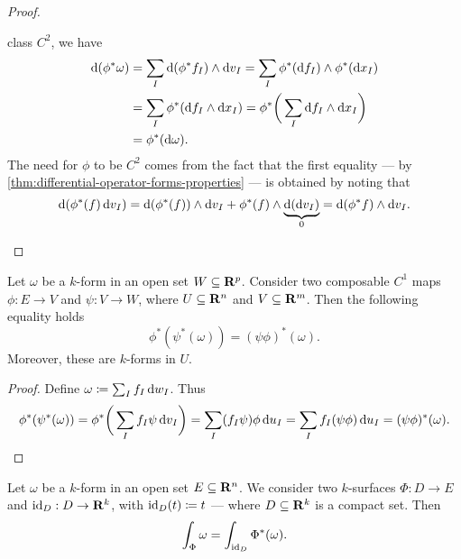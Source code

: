 \begin{proof}
\begin{enumerate}[(a)]
              class \(C^2\), we have
              \begin{align*}
                  \mathrm{d} (\phi^{*} \omega)
                   & = \sum_I \mathrm{d}(\phi^{*} f_{I}) \wedge \mathrm{d} v_{I}
                  = \sum_I \phi^{*}(\mathrm{d} f_I) \wedge \phi^{*} (\mathrm{d} x_{I}) \\
                   & = \sum_I \phi^{*}(\mathrm{d} f_I \wedge \mathrm{d} x_I)
                  = \phi^{*} \bigg( \sum_I \mathrm{d} f_I \wedge \mathrm{d} x_I \bigg) \\
                   & = \phi^{*}(\mathrm{d} \omega).
              \end{align*}
              The need for \(\phi\) to be \(C^2\) comes from the fact that the first
              equality --- by \cref{thm:differential-operator-forms-properties} --- is
              obtained by noting that
              \[
                  \mathrm{d} (\phi^{*}(f)\, \mathrm{d} v_I)
                  = \mathrm{d} (\phi^{*}(f)) \wedge \mathrm{d} v_I
                  + \phi^{*}(f) \wedge \underbrace{\mathrm{d}(\mathrm{d} v_I)}_{0}
                  = \mathrm{d} (\phi^{*}f) \wedge \mathrm{d} v_I.
              \]
    \end{enumerate}
\end{proof}

\begin{lemma}
    \label{lem:pullback-composition-forms}
    Let \(\omega\) be a \(k\)-form in an open set \(W \subseteq \mathbf{R}^p\). Consider two
    composable \(C^1\) maps \(\phi: E \to V\) and \(\psi: V \to W\), where \(U
    \subseteq \mathbf{R}^n\) and \(V \subseteq \mathbf{R}^m\). Then the following equality holds
    \[
        \phi^{*}(\psi^{*}(\omega)) = {(\psi \phi)}^{*}(\omega).
    \]
    Moreover, these are \(k\)-forms in \(U\).
\end{lemma}

\begin{proof}
    Define \(\omega \coloneq \sum_I f_I\, \mathrm{d} w_I\). Thus
    \begin{align*}
        \phi^{*}(\psi^{*}(\omega))
        = \phi^{*} \bigg( \sum_I f_I \psi\, \mathrm{d} v_I \bigg)
        = \sum_I (f_I \psi) \phi\, \mathrm{d} u_I
        = \sum_I f_I (\psi \phi)\, \mathrm{d} u_I
        = (\psi \phi)^{*} (\omega).
    \end{align*}
\end{proof}

\begin{lemma}
    \label{lem:integral-on-k-surface}
    Let \(\omega\) be a \(k\)-form in an open set \(E \subseteq \mathbf{R}^n\). We consider
    two \(k\)-surfaces \(\Phi: D \to E\) and \(\operatorname{id}_D: D \to \mathbf{R}^k\), with \(\operatorname{id}_D(t)
    \coloneq t\) --- where \(D \subseteq \mathbf{R}^k\) is a compact set. Then
    \[
        \int_{\Phi} \omega = \int_{\operatorname{id}_D} \Phi^{*}(\omega).
    \]
\end{lemma}

